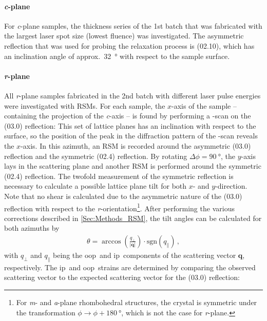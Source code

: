 \paragraph{\textit{c}-plane}
    For \textit{c}-plane samples, the thickness series of the 1st batch that was fabricated with the largest laser spot size (lowest fluence) was investigated.
    The asymmetric reflection that was used for probing the relaxation process is (02.10), which has an inclination angle of approx.\ \qty{32}{\degree} with respect to the sample surface.
\paragraph{\textit{r}-plane}
    All \textit{r}-plane samples fabricated in the 2nd batch with different laser pulse energies were investigated with \glspl{RSM}.
    For each sample, the $x$-axis of the sample -- containing the projection of the \textit{c}-axis -- is found by performing a \textphi-scan on the (03.0) reflection:
    This set of lattice planes has an inclination with respect to the surface, so the position of the peak in the diffraction pattern of the \textphi-scan reveals the $x$-axis.
    In this azimuth, an \gls{RSM} is recorded around the asymmetric (03.0) reflection and the symmetric (02.4) reflection.
    By rotating $\Delta\phi=\qty{90}{\degree}$, the $y$-axis lays in the scattering plane and another \gls{RSM} is performed around the symmetric (02.4) reflection.
    The twofold measurement of the symmetric reflection is necessary to calculate a possible lattice plane tilt for both $x$- and $y$-direction.
    Note that no shear is calculated due to the asymmetric nature of the (03.0) reflection with respect to the \textit{r}-orientation\footnote{
        For \textit{m}- and \textit{a}-plane rhombohedral structures, the crystal is symmetric under the transformation $\phi\rightarrow\phi+\qty{180}{\degree}$, which is not the case for \textit{r}-plane.
    }.
    After performing the various corrections described in \ref{Sec:Methods_RSM}, the tilt angles can be calculated for both azimuths by
    \begin{eqnarray}
        \theta = \arccos\left(
            \frac{q_\perp}{|\mathbf{q}|}
        \right) \cdot\mathrm{sgn}\left(q_\parallel\right)\,,
        \label{Equ:Results_3_tiltAngle}
    \end{eqnarray}
    with $q_\perp$ and $q_\parallel$ being the \gls{oop}\ and \gls{ip}\ components of the scattering vector $\mathbf{q}$, respectively.
    The \gls{ip}\ and \gls{oop}\ strains are determined by comparing the observed scattering vector to the expected scattering vector for the (03.0) reflection:
